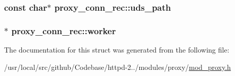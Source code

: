 \subsubsection[{\texorpdfstring{uds\+\_\+path}{uds_path}}]{\setlength{\rightskip}{0pt plus 5cm}const char$\ast$ proxy\+\_\+conn\+\_\+rec\+::uds\+\_\+path}\hypertarget{structproxy__conn__rec_a05cf8ee2b1f688ca7bc107d64d9b1e5c}{}\label{structproxy__conn__rec_a05cf8ee2b1f688ca7bc107d64d9b1e5c}
\subsubsection[{\texorpdfstring{worker}{worker}}]{$\ast$ proxy\+\_\+conn\+\_\+rec\+::worker}\hypertarget{structproxy__conn__rec_a9e64d27be4ec60359640133cebf67f93}{}\label{structproxy__conn__rec_a9e64d27be4ec60359640133cebf67f93}


The documentation for this struct was generated from the following file\+:\begin{DoxyCompactItemize}
\item 
/usr/local/src/github/\+Codebase/httpd-\/2../modules/proxy/\hyperlink{mod__proxy_8h}{mod\+\_\+proxy.\+h}\end{DoxyCompactItemize}
